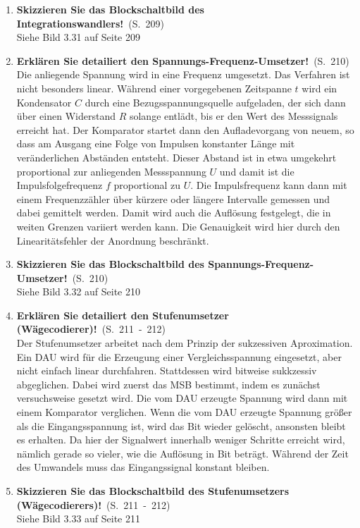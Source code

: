\documentclass[a4paper,12pt]{article}
\newcommand{\statement}[3]{\pagebreak[3]\item {\textbf{#1!}}\ (S.\ #2)#3}
\newcommand{\normaltext}[1]{\\#1}
\newcommand{\page}[1]{#1}
\newcommand{\pages}[2]{#1\ -\ #2}
\newcommand{\view}[2]{\index{Skizze}Siehe Bild #1 auf Seite #2}
\begin{document}
\begin{enumerate}
  \statement{Skizzieren Sie das Blockschaltbild des Integrationswandlers}{\page{209}}
  {
    \normaltext{\view{3.31}{209}}
  }

  \statement{Erklären Sie detailiert den Spannungs-Frequenz-Umsetzer}{\page{210}}
  {
    \normaltext{Die anliegende Spannung wird in eine Frequenz umgesetzt. Das Verfahren ist
                nicht besonders linear. Während einer vorgegebenen Zeitspanne $t$ wird
                ein Kondensator $C$ durch eine Bezugsspannungsquelle aufgeladen, der sich
                dann über einen Widerstand $R$ solange entlädt, bis er den Wert des Messsignals
                erreicht hat. Der Komparator startet dann den Aufladevorgang von neuem, so dass
                am Ausgang eine Folge von Impulsen konstanter Länge mit veränderlichen Abständen
                entsteht. Dieser Abstand ist in etwa umgekehrt proportional zur anliegenden
                Messspannung $U$ und damit ist die Impulsfolgefrequenz $f$ proportional zu $U$.
                Die Impulsfrequenz kann dann mit einem Frequenzzähler über kürzere oder
                längere Intervalle gemessen und dabei gemittelt werden. Damit wird auch die
                Auflösung festgelegt, die in weiten Grenzen variiert werden kann. Die Genauigkeit
                wird hier durch den Linearitätsfehler der Anordnung beschränkt.}
  }

  \statement{Skizzieren Sie das Blockschaltbild des Spannungs-Frequenz-Umsetzer} {\page{210}}
  {
    \normaltext{\view{3.32}{210}}
  }

  \statement{Erklären Sie detailiert den Stufenumsetzer (Wägecodierer)}{\pages{211}{212}}
  {
    \normaltext{Der Stufenumsetzer arbeitet nach dem Prinzip der sukzessiven Aproximation. Ein DAU
                wird für die Erzeugung einer Vergleichsspannung eingesetzt, aber nicht einfach linear
                durchfahren. Stattdessen wird bitweise sukkzessiv abgeglichen. Dabei wird zuerst das
                MSB bestimmt, indem es zunächst versuchsweise gesetzt wird. Die vom DAU erzeugte
                Spannung wird dann mit einem Komparator verglichen. Wenn die vom DAU erzeugte Spannung
                größer als die Eingangsspannung ist, wird das Bit wieder gelöscht, ansonsten bleibt
                es erhalten. Da hier der Signalwert innerhalb weniger Schritte erreicht wird, nämlich
                gerade so vieler, wie die Auflösung in Bit beträgt. Während der Zeit des Umwandels muss das
                Eingangssignal konstant bleiben.}
  }

  \statement{Skizzieren Sie das Blockschaltbild des Stufenumsetzers (Wägecodierers)} {\pages{211}{212}}
  {
    \normaltext{\view{3.33}{211}}
  }


\end{enumerate}
\end{document}
